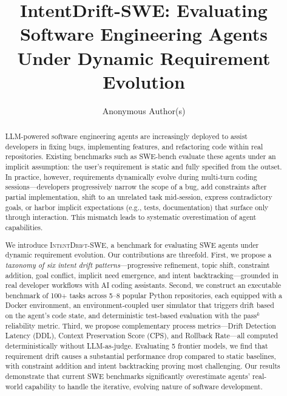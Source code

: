 \documentclass{article}
\title{IntentDrift-SWE: Evaluating Software Engineering Agents \\ Under Dynamic Requirement Evolution}
\author{
  Anonymous Author(s)
}
\newcommand{\bench}{\textsc{IntentDrift-SWE}}
\begin{document}
\maketitle

\begin{abstract}
LLM-powered software engineering agents are increasingly deployed to assist developers in fixing bugs, implementing features, and refactoring code within real repositories. Existing benchmarks such as SWE-bench evaluate these agents under an implicit assumption: the user's requirement is static and fully specified from the outset. In practice, however, requirements dynamically evolve during multi-turn coding sessions---developers progressively narrow the scope of a bug, add constraints after partial implementation, shift to an unrelated task mid-session, express contradictory goals, or harbor implicit expectations (e.g., tests, documentation) that surface only through interaction. This mismatch leads to systematic overestimation of agent capabilities.

We introduce \bench{}, a benchmark for evaluating SWE agents under dynamic requirement evolution. Our contributions are threefold. First, we propose a \emph{taxonomy of six intent drift patterns}---progressive refinement, topic shift, constraint addition, goal conflict, implicit need emergence, and intent backtracking---grounded in real developer workflows with AI coding assistants. Second, we construct an executable benchmark of 100+ tasks across 5--8 popular Python repositories, each equipped with a Docker environment, an environment-coupled user simulator that triggers drift based on the agent's code state, and deterministic test-based evaluation with the $\text{pass}^k$ reliability metric. Third, we propose complementary process metrics---Drift Detection Latency (DDL), Context Preservation Score (CPS), and Rollback Rate---all computed deterministically without LLM-as-judge. Evaluating 5 frontier models, we find that requirement drift causes a substantial performance drop compared to static baselines, with constraint addition and intent backtracking proving most challenging. Our results demonstrate that current SWE benchmarks significantly overestimate agents' real-world capability to handle the iterative, evolving nature of software development.
\end{abstract}


\end{document}
